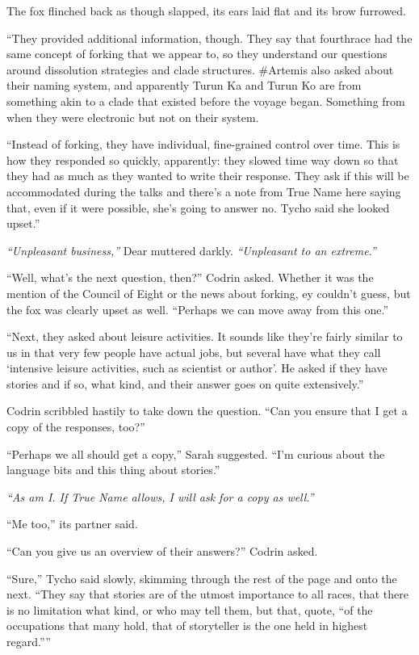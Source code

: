 The fox flinched back as though slapped, its ears laid flat and its brow furrowed.

``They provided additional information, though. They say that fourthrace had the same concept of forking that we appear to, so they understand our questions around dissolution strategies and clade structures. \#Artemis also asked about their naming system, and apparently Turun Ka and Turun Ko are from something akin to a clade that existed before the voyage began. Something from when they were electronic but not on their system.

``Instead of forking, they have individual, fine-grained control over time. This is how they responded so quickly, apparently: they slowed time way down so that they had as much as they wanted to write their response. They ask if this will be accommodated during the talks and there's a note from True Name here saying that, even if it were possible, she's going to answer no. Tycho said she looked upset.''

\emph{``Unpleasant business,''} Dear muttered darkly. \emph{``Unpleasant to an extreme.''}

``Well, what's the next question, then?'' Codrin asked. Whether it was the mention of the Council of Eight or the news about forking, ey couldn't guess, but the fox was clearly upset as well. ``Perhaps we can move away from this one.''

``Next, they asked about leisure activities. It sounds like they're fairly similar to us in that very few people have actual jobs, but several have what they call `intensive leisure activities, such as scientist or author'. He asked if they have stories and if so, what kind, and their answer goes on quite extensively.''

Codrin scribbled hastily to take down the question. ``Can you ensure that I get a copy of the responses, too?''

``Perhaps we all should get a copy,'' Sarah suggested. ``I'm curious about the language bits and this thing about stories.''

\emph{``As am I. If True Name allows, I will ask for a copy as well.''}

``Me too,'' its partner said.

``Can you give us an overview of their answers?'' Codrin asked.

``Sure,'' Tycho said slowly, skimming through the rest of the page and onto the next. ``They say that stories are of the utmost importance to all races, that there is no limitation what kind, or who may tell them, but that, quote, ``of the occupations that many hold, that of storyteller is the one held in highest regard.''''

